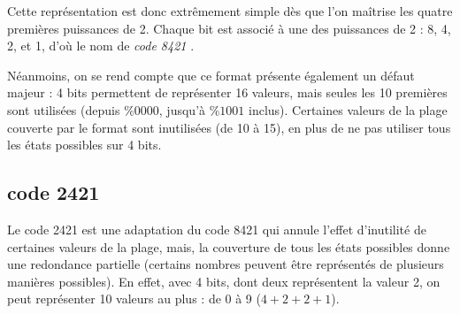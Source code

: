 \documentclass[11pt,a4paper]{article}
\begin{document}
\smallskip

Cette représentation est donc extrêmement simple dès que l'on maîtrise les quatre premières puissances de 2.
Chaque bit est associé à une des puissances de 2 : 8, 4, 2, et 1, d'où le nom de \og \textit{code 8421} \fg{}.

Néanmoins, on se rend compte que ce format présente également un défaut majeur : 4 bits permettent de représenter 16 valeurs, mais seules les 10 premières sont utilisées (depuis $ \text{\%} 0000 $, jusqu'à $ \text{\%} 1001 $ inclus).
Certaines valeurs de la plage couverte par le format sont inutilisées (de 10 à 15), en plus de ne pas utiliser tous les états possibles sur 4 bits.


\bigskip


\subsection{code 2421}

Le code 2421 est une adaptation du code 8421 qui annule l'effet d'inutilité de certaines valeurs de la plage, mais, la couverture de tous les états possibles donne une redondance partielle (certains nombres peuvent être représentés de plusieurs manières possibles).
En effet, avec 4 bits, dont deux représentent la valeur 2, on peut représenter 10 valeurs au plus : de 0 à 9 ($ 4 + 2 + 2 + 1 $).
\end{document}
